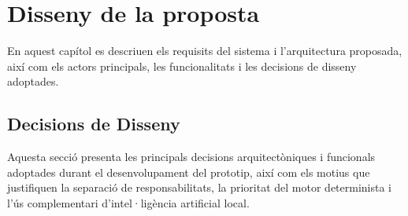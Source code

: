 \section{Disseny de la proposta}
\label{cap:design}

En aquest capítol es descriuen els requisits del sistema i l’arquitectura proposada, així com els actors principals, les funcionalitats i les decisions de disseny adoptades.











\subsection{Decisions de Disseny}
Aquesta secció presenta les principals decisions arquitectòniques i funcionals adoptades durant el desenvolupament del prototip, així com els motius que justifiquen la separació de responsabilitats, la prioritat del motor determinista i l'ús complementari d'intel·ligència artificial local.


